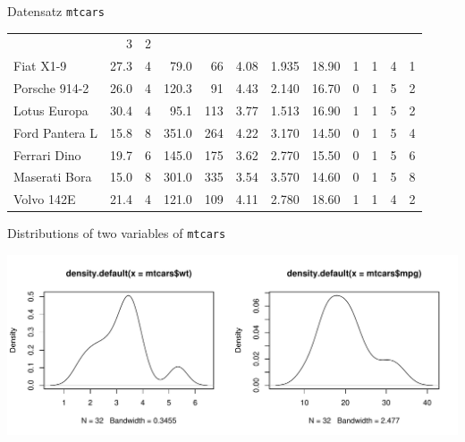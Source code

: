 \documentclass[ignorenonframetext,]{beamer}
\newenvironment{Shaded}{\begin{snugshade}}{\end{snugshade}}
\newcommand{\DataTypeTok}[1]{\textcolor[rgb]{0.13,0.29,0.53}{#1}}
\newcommand{\DecValTok}[1]{\textcolor[rgb]{0.00,0.00,0.81}{#1}}
\newcommand{\KeywordTok}[1]{\textcolor[rgb]{0.13,0.29,0.53}{\textbf{#1}}}
\newcommand{\NormalTok}[1]{#1}
\newcommand{\OperatorTok}[1]{\textcolor[rgb]{0.81,0.36,0.00}{\textbf{#1}}}
\begin{document}
\begin{frame}{Datensatz \texttt{mtcars}}
\begin{longtable}[]{@{}lrrrrrrrrrrr@{}}
& 3 & 2\tabularnewline
Fiat X1-9 & 27.3 & 4 & 79.0 & 66 & 4.08 & 1.935 & 18.90 & 1 & 1 & 4 &
1\tabularnewline
Porsche 914-2 & 26.0 & 4 & 120.3 & 91 & 4.43 & 2.140 & 16.70 & 0 & 1 & 5
& 2\tabularnewline
Lotus Europa & 30.4 & 4 & 95.1 & 113 & 3.77 & 1.513 & 16.90 & 1 & 1 & 5
& 2\tabularnewline
Ford Pantera L & 15.8 & 8 & 351.0 & 264 & 4.22 & 3.170 & 14.50 & 0 & 1 &
5 & 4\tabularnewline
Ferrari Dino & 19.7 & 6 & 145.0 & 175 & 3.62 & 2.770 & 15.50 & 0 & 1 & 5
& 6\tabularnewline
Maserati Bora & 15.0 & 8 & 301.0 & 335 & 3.54 & 3.570 & 14.60 & 0 & 1 &
5 & 8\tabularnewline
Volvo 142E & 21.4 & 4 & 121.0 & 109 & 4.11 & 2.780 & 18.60 & 1 & 1 & 4 &
2\tabularnewline
\bottomrule
\end{longtable}

\end{frame}

\begin{frame}[fragile]{Distributions of two variables of
\texttt{mtcars}}
\protect\hypertarget{distributions-of-two-variables-of-mtcars}{}

\begin{Shaded}
\end{Shaded}

\includegraphics{B3_linreg_files/figure-beamer/unnamed-chunk-5-1.pdf}

\end{frame}
\end{document}
